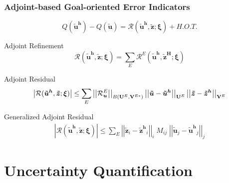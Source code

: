 \documentclass[mathserif]{beamer}
\newcommand{\abs}[1]{\ensuremath{ \left|#1\right|}}
\newcommand{\norm}[1]{\ensuremath{ \left|\left|#1\right|\right|}}
\newcommand{\bv}[1]{{\ensuremath{\boldsymbol{#1}}}}
\newcommand{\Res}{{\ensuremath{\mathcal R}}}
\newcommand{\Unknowns}{{\ensuremath{\bf{U}}}}
\newcommand{\unknown}{{\ensuremath{\bv{u}}}}
\newcommand{\primalsol}{{\ensuremath{\bv{\tilde{u}}}}}
\newcommand{\primalsolh}{{\ensuremath{\bv{\tilde{u}^h}}}}
\newcommand{\adjointsol}{{\ensuremath{\bv{\tilde{z}}}}}
\newcommand{\adjointsolh}{{\ensuremath{\bv{\tilde{z}^h}}}}
\newcommand{\adjointsolH}{{\ensuremath{\bv{\tilde{z}^H}}}}
\newcommand{\Testfuncs}{{\ensuremath{\bf{V}}}}
\newcommand{\elem}{\ensuremath{E}}
\newcommand{\Qoi}{{\ensuremath{Q}}}
\newcommand{\param}{{\ensuremath{\xi}}}
\newcommand{\params}{{\ensuremath{\bv{\param}}}}
\begin{document}
\begin{frame}
\frametitle{Adjoint-based Goal-oriented Error Indicators}

\begin{equation*}
\Qoi(\primalsolh) - \Qoi(\primalsol) = \Res(\primalsolh, \adjointsol; \params) + H.O.T.
\end{equation*}

\begin{block}{Adjoint Refinement}
\begin{equation*}
\Res(\primalsolh, \adjointsol; \params) = \sum_\elem 
\Res^\elem(\primalsolh, \adjointsolH; \params)
\end{equation*}
\end{block}

\begin{block}{Adjoint Residual}
\begin{equation*}
\abs{\Res(\primalsolh, \adjointsol; \params)} \leq
\sum_\elem \norm{\Res^\elem_\unknown}_{B(\Unknowns^\elem,
\Testfuncs^{\elem *})}
\norm{\primalsol - \primalsolh}_{\Unknowns^\elem}
\norm{\adjointsol - \adjointsolh}_{\Testfuncs^\elem}
\end{equation*}
\end{block}

\begin{block}{Generalized Adjoint Residual}
\begin{align*}
\abs{\Res(\primalsolh, \adjointsol; \params)}
\leq \sum_\elem \norm{\adjointsol_i-\adjointsolh_i}_i \; M_{ij} \; \norm{\primalsol_j-\primalsolh_j
}_j \nonumber
\end{align*}
\end{block}

\end{frame}



\section{Uncertainty Quantification}
\end{document}
